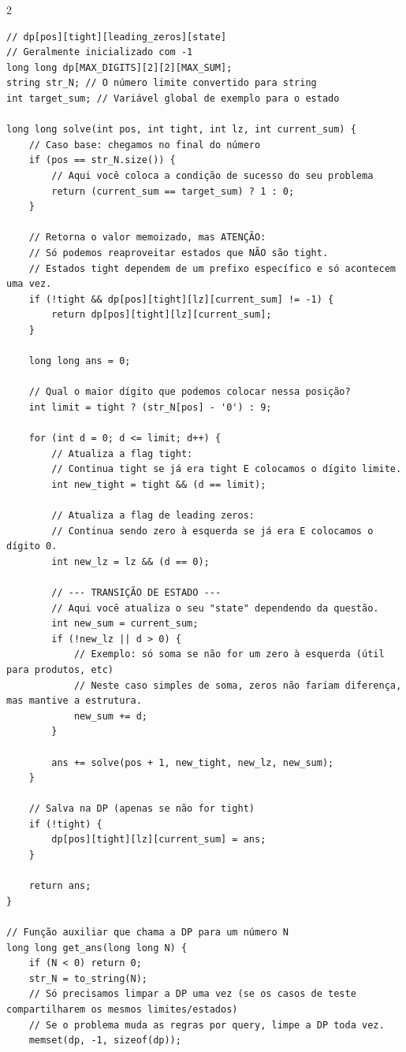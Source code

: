 \documentclass[11pt]{article}
\begin{document}
\begin{multicols}{2}
\begin{lstlisting}
// dp[pos][tight][leading_zeros][state]
// Geralmente inicializado com -1
long long dp[MAX_DIGITS][2][2][MAX_SUM];
string str_N; // O número limite convertido para string
int target_sum; // Variável global de exemplo para o estado

long long solve(int pos, int tight, int lz, int current_sum) {
    // Caso base: chegamos no final do número
    if (pos == str_N.size()) {
        // Aqui você coloca a condição de sucesso do seu problema
        return (current_sum == target_sum) ? 1 : 0;
    }

    // Retorna o valor memoizado, mas ATENÇÃO: 
    // Só podemos reaproveitar estados que NÃO são tight. 
    // Estados tight dependem de um prefixo específico e só acontecem uma vez.
    if (!tight && dp[pos][tight][lz][current_sum] != -1) {
        return dp[pos][tight][lz][current_sum];
    }

    long long ans = 0;
    
    // Qual o maior dígito que podemos colocar nessa posição?
    int limit = tight ? (str_N[pos] - '0') : 9;

    for (int d = 0; d <= limit; d++) {
        // Atualiza a flag tight: 
        // Continua tight se já era tight E colocamos o dígito limite.
        int new_tight = tight && (d == limit);
        
        // Atualiza a flag de leading zeros:
        // Continua sendo zero à esquerda se já era E colocamos o dígito 0.
        int new_lz = lz && (d == 0);
        
        // --- TRANSIÇÃO DE ESTADO ---
        // Aqui você atualiza o seu "state" dependendo da questão.
        int new_sum = current_sum;
        if (!new_lz || d > 0) { 
            // Exemplo: só soma se não for um zero à esquerda (útil para produtos, etc)
            // Neste caso simples de soma, zeros não fariam diferença, mas mantive a estrutura.
            new_sum += d;
        }

        ans += solve(pos + 1, new_tight, new_lz, new_sum);
    }

    // Salva na DP (apenas se não for tight)
    if (!tight) {
        dp[pos][tight][lz][current_sum] = ans;
    }

    return ans;
}

// Função auxiliar que chama a DP para um número N
long long get_ans(long long N) {
    if (N < 0) return 0;
    str_N = to_string(N);
    // Só precisamos limpar a DP uma vez (se os casos de teste compartilharem os mesmos limites/estados)
    // Se o problema muda as regras por query, limpe a DP toda vez.
    memset(dp, -1, sizeof(dp)); 
    

\end{lstlisting}
\end{multicols}
\end{document}
